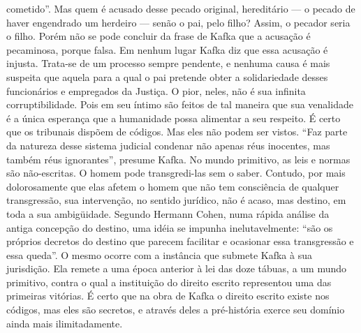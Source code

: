cometido''. Mas quem é acusado desse pecado original, hereditário --- o
pecado de haver engendrado um herdeiro --- senão o pai, pelo filho?
Assim, o pecador seria o filho. Porém não se pode concluir da frase de
Kafka que a acusação é pecaminosa, porque falsa. Em nenhum lugar Kafka
diz que essa acusação é injusta. Trata-se de um processo sempre
pendente, e nenhuma causa é mais suspeita que aquela para a qual o pai
pretende obter a solidariedade desses funcionários e empregados da
Justiça. O pior, neles, não é sua infinita corruptibilidade. Pois em seu
íntimo são feitos de tal maneira que sua venalidade é a única esperança
que a humanidade possa alimentar a seu respeito. É certo que os
tribunais dispõem de códigos. Mas eles não podem ser vistos. ``Faz parte
da natureza desse sistema judicial condenar não apenas réus inocentes,
mas também réus ignorantes'', presume Kafka. No mundo primitivo, as leis
e normas são não-escritas. O homem pode transgredi-las sem o saber.
Contudo, por mais dolorosamente que elas afetem o homem que não tem
consciência de qualquer transgressão, sua intervenção, no sentido
jurídico, não é acaso, mas destino, em toda a sua ambigüidade. Segundo
Hermann Cohen, numa rápida análise da antiga concepção do destino, uma
idéia se impunha inelutavelmente: ``são os próprios decretos do destino
que parecem facilitar e ocasionar essa transgressão e essa queda''. O
mesmo ocorre com a instância que submete Kafka à sua jurisdição. Ela
remete a uma época anterior à lei das doze tábuas, a um mundo primitivo,
contra o qual a instituição do direito escrito representou uma das
primeiras vitórias. É certo que na obra de Kafka o direito escrito
existe nos códigos, mas eles são secretos, e através deles a
pré-história exerce seu domínio ainda mais ilimitadamente.

